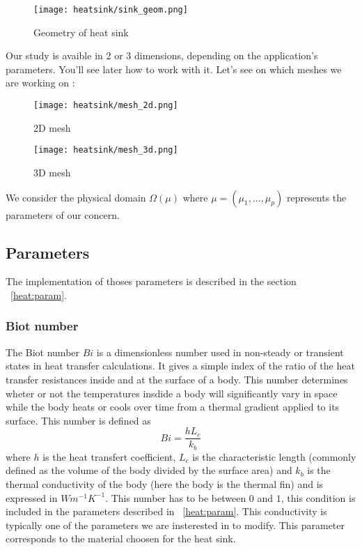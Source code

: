 \begin{figure}[!h]
\centering
\texttt{[image: heatsink/sink\_geom.png]}
\caption{Geometry of heat sink}
\end{figure}

Our study is avaible in 2 or 3 dimensions, depending on the application's parameters. You'll see later how to work with it. Let's see on which meshes we are working on :
\begin{figure}[!h]
\begin{minipage}[b]{.50\linewidth}
\centering
\texttt{[image: heatsink/mesh\_2d.png]}
\caption{2D mesh}
\end{minipage}
\begin{minipage}[b]{.50\linewidth}
\centering
\texttt{[image: heatsink/mesh\_3d.png]}
\caption{3D mesh}
\end{minipage}
\end{figure}

We consider the physical domain $\varOmega (\mu)$ where $\mu = (\mu_1, ...,\mu_p)$ represents the parameters of our concern. 

\subsection{Parameters}
The implementation of thoses parameters is described in the section ~\ref{heat:param}.

\subsubsection{Biot number}
The Biot number $Bi$ is a dimensionless number used in non-steady or transient states in heat transfer calculations. It gives a simple index of the ratio of the heat transfer resistances inside  and at the surface of a body. This number determines wheter or not the temperatures insdide a body will significantly vary in space while the body heats or cools over time from a thermal gradient applied to its surface. This number is defined as 
\begin{equation}
Bi = \frac{hL_c}{k_b}
\end{equation} 
where $h$ is the heat transfert coefficient, $L_c$ is the characteristic length (commonly defined as the volume of the body divided by the surface area) and $k_b$ is the thermal conductivity of the body (here the body is the thermal fin) and is expressed in $Wm^{-1}K^{-1}$. This number has to be between $0$ and $1$, this condition is included in the parameters described in ~\ref{heat:param}. This conductivity is typically one of the parameters we are insterested in to modify. This parameter corresponds to the material choosen for the heat sink. 

